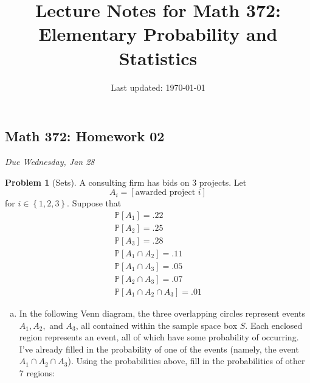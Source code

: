 \documentclass[10pt]{article}
\title{Lecture Notes for Math 372: \\Elementary Probability and Statistics}
\date{Last updated: \today}
\theoremstyle{definition}
\newtheorem{problem}[theorem]{Problem}
\newcommand{\1}[1]{\textbf{1}_{\left[#1\right]}} %
\def\P{\mathbb{P}} %
\begin{document}
\begin{center}
  \section*{Math 372: Homework 02}
  \textit{Due Wednesday, Jan 28}
\end{center}
\begin{problem}[Sets]
  A consulting firm has bids on 3 projects. Let
  \begin{equation*}
    A_{i} = \left[ \text{awarded project } i \right] 
  \end{equation*}
  for $i\in \left\{1,2,3\right\}$. Suppose that
  \begin{gather*}
    \P\left[A_{1} \right]= .22\\
    \P\left[A_{2} \right]= .25\\
    \P\left[A_{3} \right]= .28\\
    \P\left[A_{1}\cap A_{2} \right]= .11\\
    \P\left[A_{1}\cap A_{3} \right]= .05\\
    \P\left[A_{2}\cap A_{3} \right]= .07\\
    \P\left[A_{1}\cap A_{2}\cap A_{3} \right]= .01
  \end{gather*}

  \begin{enumerate}[(a)]
    \item In the following Venn diagram, the three overlapping circles represent events $A_{1},A_{2},$ and
    $A_{3}$, all contained within the sample space box $S$. Each enclosed region represents an event, all
    of which have some probability of occurring. I've already filled in the probability of one of the
    events (namely, the event $A_{1}\cap A_{2}\cap A_{3}$). Using the probabilities above, fill in the
    probabilities of other 7 regions:
    \begin{center}
    \end{center}


\end{enumerate}
\end{problem}
\end{document}
